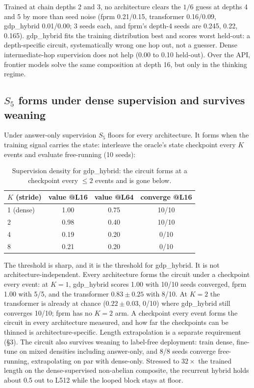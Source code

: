 \documentclass[11pt]{article}
\newcommand{\Sfive}{$S_5$}
\begin{document}
Trained at chain depths 2 and 3, no architecture clears the $1/6$ guess at depths 4 and 5 by
more than seed noise (fprm 0.21/0.15, transformer 0.16/0.09, gdp\_hybrid 0.01/0.00; 3 seeds
each, and fprm's depth-4 seeds are 0.245, 0.22, 0.165). gdp\_hybrid fits
the training distribution best and scores worst held-out: a depth-specific circuit,
systematically wrong one hop out, not a guesser. Dense intermediate-hop supervision does not
help (0.00 to 0.10 held-out). Over the API, frontier models solve the same composition at depth 16, but only in the thinking regime.

\subsection{\Sfive{} forms under dense supervision and survives weaning}

Under answer-only supervision \Sfive{} floors for every architecture. It forms when the
training signal carries the state: interleave the oracle's state checkpoint every $K$ events
and evaluate free-running (10 seeds):

\begin{table}[h]
\centering
\begin{tabular}{lccc}
\toprule
$K$ (stride) & value @L16 & value @L64 & converge @L16 \\
\midrule
1 (dense) & 1.00 & 0.75 & 10/10 \\
2 & 0.98 & 0.40 & 10/10 \\
4 & 0.19 & 0.20 & 0/10 \\
8 & 0.21 & 0.20 & 0/10 \\
\bottomrule
\end{tabular}
\caption{Supervision density for gdp\_hybrid: the circuit forms at a checkpoint every $\le 2$
events and is gone below.}
\label{tab:density}
\end{table}

The threshold is sharp, and it is the threshold for gdp\_hybrid. It is not
architecture-independent. Every architecture forms the circuit under a checkpoint every event:
at $K=1$, gdp\_hybrid scores 1.00 with 10/10 seeds converged, fprm 1.00 with 5/5, and the
transformer $0.83 \pm 0.25$ with 8/10. At $K=2$ the transformer is already at chance
($0.22 \pm 0.03$, 0/10) where gdp\_hybrid still converges 10/10; fprm has no $K=2$ arm. A
checkpoint every event forms the circuit in every architecture measured, and how far the
checkpoints can be thinned is architecture-specific. Length extrapolation is a separate requirement (\S3). The circuit also survives weaning to label-free deployment: train dense, fine-tune on
mixed densities including answer-only, and 8/8 seeds converge free-running, extrapolating on
par with dense-only. Stressed to $32\times$ the trained length on the dense-supervised
non-abelian composite, the recurrent hybrid holds about 0.5 out to L512 while the looped block
stays at floor.
\end{document}

